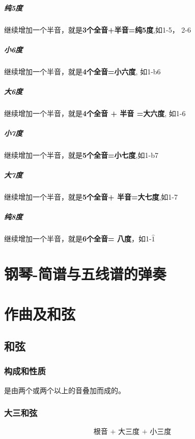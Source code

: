 \documentclass[UTF8,a4paper,12pt]{ctexbook}
\begin{document}
			\paragraph{纯5度}				
				继续增加一个半音，就是\textbf{3个全音+半音=纯5度},如1-5， 2-6
				
			\paragraph{小6度}
				继续增加一个半音，就是\textbf{4个全音=小六度}, 如1-b6
				
			\paragraph{大6度}	
				继续增加一个半音，就是\textbf{4个全音 + 半音 =大六度},  如1-6
				
			\paragraph{小7度}
				继续增加一个半音，就是\textbf{5个全音=小七度},如1-b7
				
			\paragraph{大7度}	
				继续增加一个半音，就是\textbf{5个全音+ 半音=大七度},如1-7
				
			\paragraph{纯8度}	
				继续增加一个半音，就是\textbf{6个全音= 八度}，如1-$\hat{1}$
							
\chapter{钢琴-简谱与五线谱的弹奏}

\chapter{作曲及和弦}
	\section{和弦}
		\subsection{构成和性质}
			是由两个或两个以上的音叠加而成的。
			
		\subsection{大三和弦}
			$$ \textbf{根音 + 大三度 + 小三度} $$
			
\end{document}
